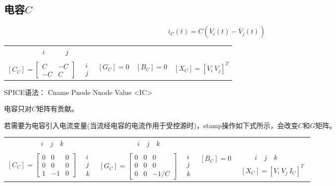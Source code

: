 \documentclass[12pt]{article}
\begin{document}
\subsection{电容$C$} \label{subsec:2.2}
\begin{equation*}
  i_C(t)=C\left(\dot{V_i}(t)-\dot{V_j}(t)\right)
\end{equation*}
\begin{table}[H]
  \centering
  \renewcommand\arraystretch{0.5}
  \begin{tabular}{ccccc}
  $ \qquad \qquad i \qquad \quad  j$ &  & & & \\                            \\
  $\left[C_C\right]=  \left[\begin{array}{cc} C & -C \\ -C & C \end{array}\right]$  & 
  $\begin{array}{c} i \\ j \end{array}$& 
  $\left[G_C\right]=0$ & 
  $\left[B_C\right]=0$ & 
  $\left[X_C\right]=\left[ V_i \ V_j \right]^T$ \\
  \end{tabular}
\end{table}
\qquad SPICE语法： Cname Pnode Nnode Value <IC>\par
\qquad 电容只对$C$矩阵有贡献。\par
\qquad 若需要为电容引入电流变量(当流经电容的电流作用于受控源时)，stamp操作如下式所示，会改变$C$和$G$矩阵。\par
\begin{table}[H]
  \centering
  \renewcommand\arraystretch{0.5}
  \begin{tabular}{cccccc}
  $ \qquad \quad i \quad j \quad k$ & & $ \qquad \quad i \quad j \quad k$ & & & \\                            \\
  $\left[C_C\right]=\left[\begin{array}{ccc} 0 & 0 & 0\\ 0 & 0 & 0\\ 1 & -1 & 0 \end{array}\right]$  & 
  $\begin{array}{c} i \\ j \\ k \end{array}$& 
  $\left[G_C\right]=\left[\begin{array}{ccc} 0 & 0 & 0\\ 0 & 0 & 0\\ 0 & 0 & -1 / C \end{array}\right]$  & 
  $\begin{array}{c} i \\ j \\ k \end{array}$ & 
  $\left[B_C\right]=0$ & 
  $\begin{array}{c} \qquad i \quad j \quad k \\ \left[X_C\right]=\left[ V_i \ V_j \ I_C \right]^T\end{array}$ \\
  \end{tabular}
\end{table}
\end{document}
